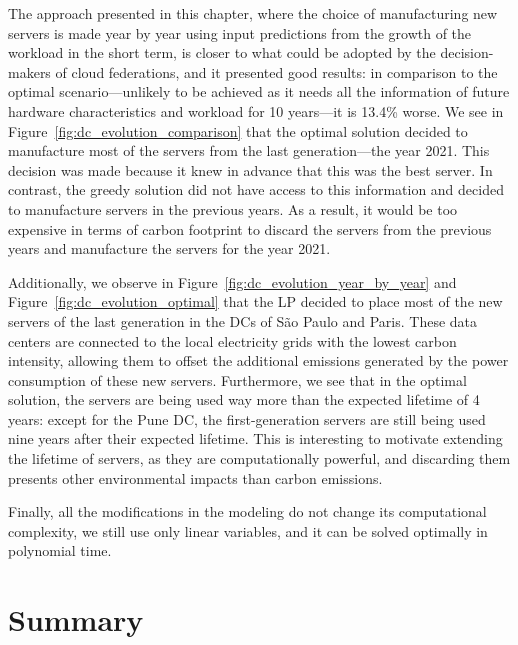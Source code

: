 The approach presented in this chapter, where the choice of manufacturing new servers is made year by year using input predictions from the growth of the workload in the short term, is closer to what could be adopted by the decision-makers of cloud federations, and it presented good results: in comparison to the optimal scenario---unlikely to be achieved as it needs all the information of future hardware characteristics and workload for 10 years---it is 13.4\% worse. We see in Figure~\ref{fig:dc_evolution_comparison} that the optimal solution decided to manufacture most of the servers from the last generation---the year 2021. This decision was made because it knew in advance that this was the best server. In contrast, the greedy solution did not have access to this information and decided to manufacture servers in the previous years. As a result, it would be too expensive in terms of carbon footprint to discard the servers from the previous years and manufacture the servers for the year 2021.

Additionally, we observe in Figure~\ref{fig:dc_evolution_year_by_year} and Figure~\ref{fig:dc_evolution_optimal} that the LP decided to place most of the new servers of the last generation in the DCs of São Paulo and Paris. These data centers are connected to the local electricity grids with the lowest carbon intensity, allowing them to offset the additional emissions generated by the power consumption of these new servers. Furthermore, we see that in the optimal solution, the servers are being used way more than the expected lifetime of 4 years: except for the Pune DC, the first-generation servers are still being used nine years after their expected lifetime. This is interesting to motivate extending the lifetime of servers, as they are computationally powerful, and discarding them presents other environmental impacts than carbon emissions. 

Finally, all the modifications in the modeling do not change its computational complexity, we still use only linear variables, and it can be solved optimally in polynomial time.

\section{Summary}

\label{sec:long_term_conclusion}

